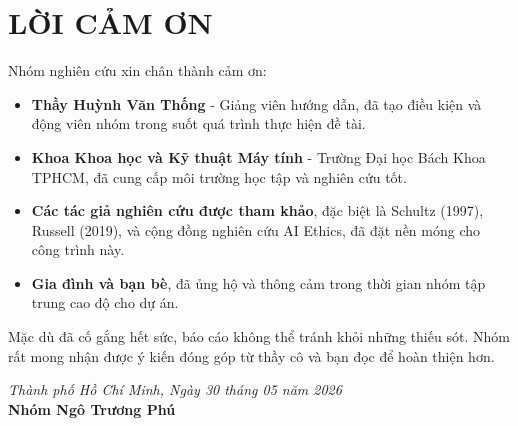 \section*{LỜI CẢM ƠN}

Nhóm nghiên cứu xin chân thành cảm ơn:

\begin{itemize}
    \item \textbf{Thầy Huỳnh Văn Thống} - Giảng viên hướng dẫn, đã tạo điều kiện và động viên nhóm trong suốt quá trình thực hiện đề tài.
    
    \item \textbf{Khoa Khoa học và Kỹ thuật Máy tính} - Trường Đại học Bách Khoa TPHCM, đã cung cấp môi trường học tập và nghiên cứu tốt.
    
    \item \textbf{Các tác giả nghiên cứu được tham khảo}, đặc biệt là Schultz (1997), Russell (2019), và cộng đồng nghiên cứu AI Ethics, đã đặt nền móng cho công trình này.
    
    \item \textbf{Gia đình và bạn bè}, đã ủng hộ và thông cảm trong thời gian nhóm tập trung cao độ cho dự án.
\end{itemize}

Mặc dù đã cố gắng hết sức, báo cáo không thể tránh khỏi những thiếu sót. Nhóm rất mong nhận được ý kiến đóng góp từ thầy cô và bạn đọc để hoàn thiện hơn.

\vspace{1cm}
\begin{flushright}
\textit{Thành phố Hồ Chí Minh, Ngày 30 tháng 05 năm 2026}\\%
\textbf{Nhóm Ngô Trương Phú}
\end{flushright}

\newpage
